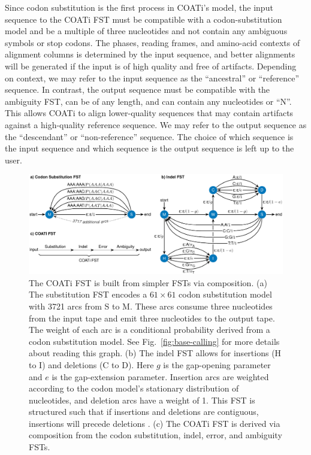 \documentclass[12pt,letterpaper]{article}
\begin{document}
Since codon substitution is the first process in COATi's model, the input sequence to the COATi FST must be compatible with a codon-substitution model and be a multiple of three nucleotides and not contain any ambiguous symbols or stop codons. The phases, reading frames, and amino-acid contexts of alignment columns is determined by the input sequence, and better alignments will be generated if the input is of high quality and free of artifacts. Depending on context, we may refer to the input sequence as the ``ancestral'' or ``reference'' sequence. In contrast, the output sequence must be compatible with the ambiguity FST, can be of any length, and can contain any nucleotides or ``N''. This allows COATi to align lower-quality sequences that may contain artifacts against a high-quality reference sequence. We may refer to the output sequence as the ``descendant'' or ``non-reference'' sequence. The choice of which sequence is the input sequence and which sequence is the output sequence is left up to the user.

\begin{figure}[h!]
\includegraphics[width=\textwidth]{figures/fig-fst-coati.pdf}
\caption{The COATi FST is built from simpler FSTs via composition.
(a) The substitution FST encodes a $61 \times 61 $ codon substitution model with 3721 arcs from S to M. These arcs consume three nucleotides from the input tape and emit three nucleotides to the output tape. The weight of each arc is a conditional probability derived from a codon substitution model. See Fig.~\ref{fig:base-calling} for more details about reading this graph.
%
(b) The indel FST allows for insertions (H to I) and deletions (C to D). Here $g$ is the gap-opening parameter and $e$ is the gap-extension parameter.
Insertion arcs are weighted according to the codon model's stationary distribution of nucleotides, and deletion arcs have a weight of 1. This FST is structured such that if insertions and deletions are contiguous, insertions will precede deletions \citep[Cf.][]{holmes2001evolutionary,demaio2021cumulative}.
%
(c) The COATi FST is derived via composition from the codon substitution, indel, error, and ambiguity FSTs.
}
\label{fig:coati-fst}
\end{figure}
\end{document}
